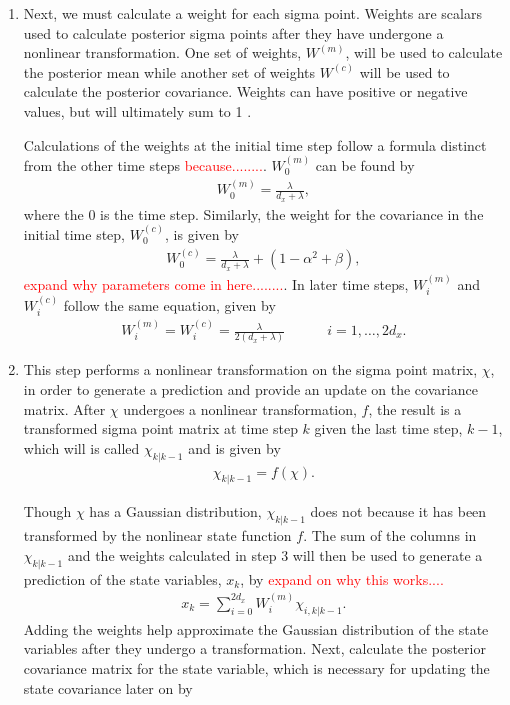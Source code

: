 \begin{enumerate}
        
        \item Next, we must calculate a weight for each sigma point. Weights are scalars used to calculate posterior sigma points after they have undergone a nonlinear transformation. One set of weights,  $W^{(m)}$, will be used to calculate the posterior mean while another set of weights $W^{(c)}$ will be used to calculate the posterior covariance. Weights can have positive or negative values, but will ultimately sum to 1 \cite{article6}.
        
        Calculations of the weights at the initial time step follow a formula distinct from the other time steps
         \textcolor{red}{because........}. $W^{(m)}_{0} $ can be found by
            \begin{align*}
        W^{(m)}_{0} = \frac{\lambda}{d_{x}+ \lambda} ,
         \end{align*}
         where the 0 is the time step. Similarly, the weight for the covariance in the initial time step, $W^{(c)}_{0}$, is given by
        \begin{align*}
        W^{(c)}_{0} = \frac{\lambda}{d_{x}+ \lambda} + (1 - \alpha^{2} + \beta) ,
         \end{align*}
          \textcolor{red}{expand why parameters come in here........}. In later time steps, $W^{(m)}_{i} $ and$ W^{(c)}_{i}$ follow the same equation, given by
               \begin{align*}
        W^{(m)}_{i} = W^{(c)}_{i} = \frac{\lambda}{2(d_{x}+ \lambda) } \quad \quad \quad i=1,\dots,2d_{x}.
            \end{align*}
           
          
           
        \item This step performs a nonlinear transformation on the sigma point matrix, $\chi$, in order to generate a prediction and provide an update on the covariance matrix. After $\chi$ undergoes a nonlinear transformation, $f$, the result is a transformed sigma point matrix at time step $k$ given the last time step, $k-1$, which will is called $\chi_{k | k - 1}$ and is given by
        \begin{align*}
        \chi_{k | k - 1} = f(\chi).
        \end{align*}
        
        
        Though $\chi$ has a Gaussian distribution,  $ \chi_{k | k - 1} $ does not because it has been transformed by the nonlinear state function $f$. The sum of the columns in $ \chi_{k | k - 1} $ and the weights calculated in step 3 will then be used to generate a prediction of the state variables, $x_k$, by 
        \textcolor{red}{expand on why this works....}
        \begin{align*}
         x_{k} = \sum^{2d_x}_{i = 0} W_i^{(m)} \chi_{i, k | k - 1}.
        \end{align*}
       Adding the weights help approximate the Gaussian distribution of the state variables after they undergo a transformation. Next, calculate the posterior covariance matrix for the state variable, which is necessary for updating the state covariance later on by


\end{enumerate}
